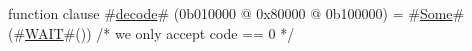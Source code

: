 function clause #\hyperref[zdecode]{decode}# (0b010000 @ 0x80000 @ 0b100000) =
  #\hyperref[zSome]{Some}#(#\hyperref[zWAIT]{WAIT}#()) /* we only accept code == 0 */
